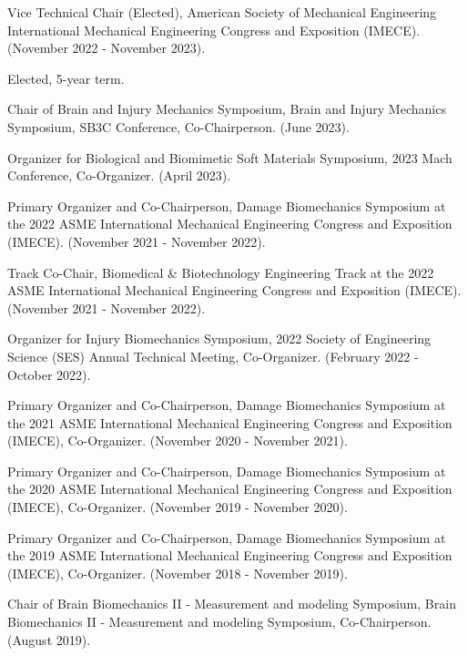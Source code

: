 \documentclass[a4paper,10pt]{article}
\begin{document}
\hspace{1cm}Vice Technical Chair (Elected), American Society of Mechanical Engineering International Mechanical Engineering Congress and Exposition (IMECE). (November 2022 - November 2023).

\hspace{1cm}Elected, 5-year term.

\hspace{1cm}Chair of Brain and Injury Mechanics Symposium, Brain and Injury Mechanics Symposium, SB3C Conference, Co-Chairperson. (June 2023).

\hspace{1cm}Organizer for Biological and Biomimetic Soft Materials Symposium, 2023 Mach Conference, Co-Organizer. (April 2023).

\hspace{1cm}Primary Organizer and Co-Chairperson, Damage Biomechanics Symposium at the 2022 ASME International Mechanical Engineering Congress and Exposition (IMECE). (November 2021 - November 2022).

\hspace{1cm}Track Co-Chair, Biomedical & Biotechnology Engineering Track at the 2022 ASME International Mechanical Engineering Congress and Exposition (IMECE). (November 2021 - November 2022).

\hspace{1cm}Organizer for Injury Biomechanics Symposium, 2022 Society of Engineering Science (SES) Annual Technical Meeting, Co-Organizer. (February 2022 - October 2022).

\hspace{1cm}Primary Organizer and Co-Chairperson, Damage Biomechanics Symposium at the 2021 ASME International Mechanical Engineering Congress and Exposition (IMECE), Co-Organizer. (November 2020 - November 2021).

\hspace{1cm}Primary Organizer and Co-Chairperson, Damage Biomechanics Symposium at the 2020 ASME International Mechanical Engineering Congress and Exposition (IMECE), Co-Organizer. (November 2019 - November 2020).

\hspace{1cm}Primary Organizer and Co-Chairperson, Damage Biomechanics Symposium at the 2019 ASME International Mechanical Engineering Congress and Exposition (IMECE), Co-Organizer. (November 2018 - November 2019).

\hspace{1cm}Chair of Brain Biomechanics II - Measurement and modeling Symposium, Brain Biomechanics II - Measurement and modeling Symposium, Co-Chairperson. (August 2019).
\end{document}
